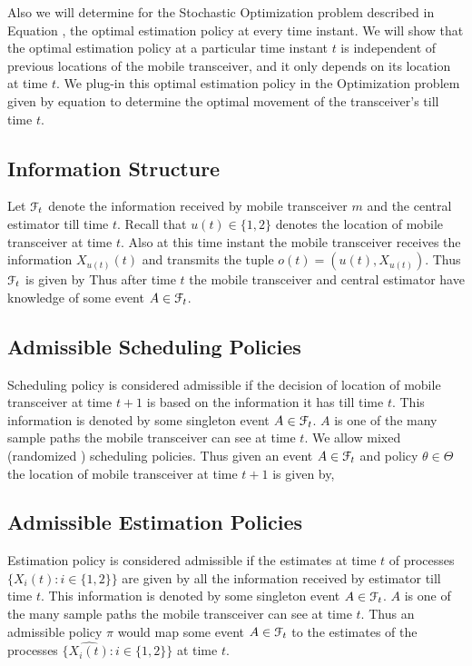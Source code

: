 \documentclass[a4paper,english,12pt]{article}
\begin{document}
Also we will determine for the Stochastic Optimization problem described in Equation , the optimal estimation policy  at every time instant. We will show that the optimal estimation policy at a particular time instant $t$ is independent of  previous locations of the mobile transceiver, and it only depends on its location at time $t$. We plug-in this optimal estimation policy in the Optimization problem given by equation  to determine the optimal movement of the transceiver's till time $t$.
\subsection{Information Structure }
Let $\mathcal{F}_t$ denote the information received by mobile transceiver $m$ and the central estimator till time $t$. Recall that $u(t) \in \{1,2\}$ denotes the location of mobile transceiver at time $t$. Also at this time instant the mobile transceiver receives the information $X_{u(t)}(t)$ and transmits the tuple $o(t)=(u(t), X_{u(t)})$. Thus $\mathcal{F}_t$  is given by  Thus after time $t$ the mobile transceiver and central estimator have knowledge of some event $ A \in \mathcal{F}_t$.
\subsection{Admissible Scheduling Policies }\label{APP}
Scheduling policy is considered admissible if the decision of location of mobile transceiver at time $t+1$ is based on the information it has till time $t$. This information is denoted by  some singleton event  $A \in \mathcal{F}_t$. $A$ is one of the many sample paths the mobile transceiver can see at time $t$.
  We allow  mixed (randomized ) scheduling policies. Thus given an event $A \in \mathcal{F}_t$ and policy $\theta \in \Theta$ the location of mobile transceiver at time $t+1$ is given by, 
\subsection{Admissible Estimation Policies}\label{AEP}
Estimation policy is considered admissible if the estimates at time $t$ of processes $\{X_i(t): i \in \{1,2\}\}$ are given by all the information received by estimator till time $t$. This information is denoted by  some singleton event $A \in \mathcal{F}_t$. $A$ is one of the many sample paths the mobile transceiver can see at time $t$. Thus an admissible policy $\pi$ would map some event $A \in \mathcal{F}_t$ to the estimates of the processes $\{\hat{X_i(t)}: i \in \{1,2\}\}$ at time $t$.
\end{document}

